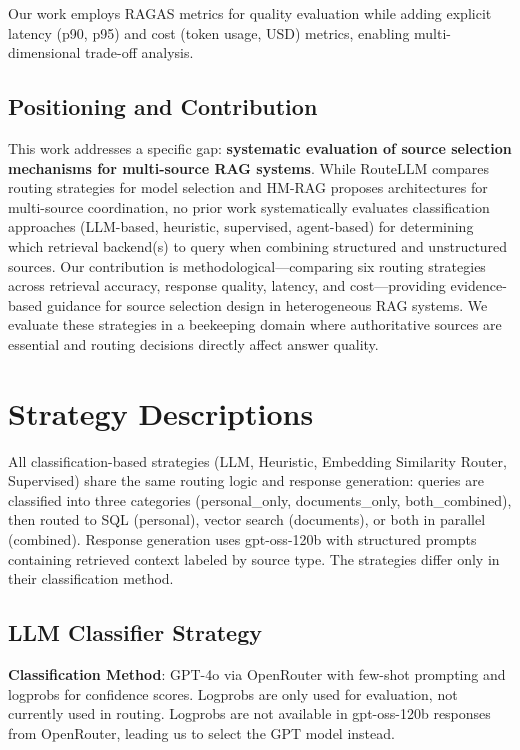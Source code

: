 \documentclass[twocolumn,10pt]{article}
\begin{document}
Our work employs RAGAS metrics for quality evaluation while adding explicit latency (p90, p95) and cost (token usage, USD) metrics, enabling multi-dimensional trade-off analysis.

\subsection{Positioning and Contribution}

This work addresses a specific gap: \textbf{systematic evaluation of source selection mechanisms for multi-source RAG systems}. While RouteLLM compares routing strategies for model selection and HM-RAG proposes architectures for multi-source coordination, no prior work systematically evaluates classification approaches (LLM-based, heuristic, supervised, agent-based) for determining which retrieval backend(s) to query when combining structured and unstructured sources. Our contribution is methodological---comparing six routing strategies across retrieval accuracy, response quality, latency, and cost---providing evidence-based guidance for source selection design in heterogeneous RAG systems. We evaluate these strategies in a beekeeping domain where authoritative sources are essential and routing decisions directly affect answer quality.

\section{Strategy Descriptions}

All classification-based strategies (LLM, Heuristic, Embedding Similarity Router, Supervised) share the same routing logic and response generation: queries are classified into three categories (personal\_only, documents\_only, both\_combined), then routed to SQL (personal), vector search (documents), or both in parallel (combined). Response generation uses gpt-oss-120b with structured prompts containing retrieved context labeled by source type. The strategies differ only in their classification method.

\subsection{LLM Classifier Strategy}

\textbf{Classification Method}: GPT-4o via OpenRouter with few-shot prompting and logprobs for confidence scores. Logprobs are only used for evaluation, not currently used in routing. Logprobs are not available in gpt-oss-120b responses from OpenRouter, leading us to select the GPT model instead.
\end{document}

